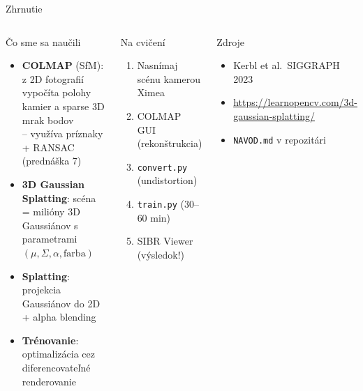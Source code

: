 \documentclass[aspectratio=169]{beamer}
\newcommand{\highlight}[1]{\textcolor{pvsoBlue}{\textbf{#1}}}
\begin{document}
\begin{frame}{Zhrnutie}

\begin{columns}[c]
\begin{block}{Čo sme sa naučili}
\begin{itemize}\setlength{\itemsep}{3pt}
    \item \highlight{COLMAP} (SfM): z 2D fotografií vypočíta polohy kamier
    a sparse 3D mrak bodov\\
    {\footnotesize – využíva príznaky + RANSAC (prednáška 7)}
    \item \highlight{3D Gaussian Splatting}: scéna = milióny 3D Gaussiánov
    s parametrami $(\mu, \Sigma, \alpha, \text{farba})$
    \item \highlight{Splatting}: projekcia Gaussiánov do 2D + alpha blending
    \item \highlight{Trénovanie}: optimalizácia cez diferencovateľné
    renderovanie
\end{itemize}
\end{block}

\begin{alertblock}{Na cvičení}
\begin{enumerate}\setlength{\itemsep}{3pt}
    \item Nasnímaj scénu kamerou Ximea
    \item COLMAP GUI (rekonštrukcia)
    \item \texttt{convert.py} (undistortion)
    \item \texttt{train.py} (30–60 min)
    \item SIBR Viewer (výsledok!)
\end{enumerate}
\end{alertblock}

\vspace{0.15cm}
\begin{block}{Zdroje}
\begin{itemize}\small\setlength{\itemsep}{2pt}
    \item Kerbl et al.\ SIGGRAPH 2023
    \item \url{https://learnopencv.com/3d-gaussian-splatting/}
    \item \texttt{NAVOD.md} v repozitári
\end{itemize}
\end{block}
\end{columns}

\end{frame}

\end{document}
